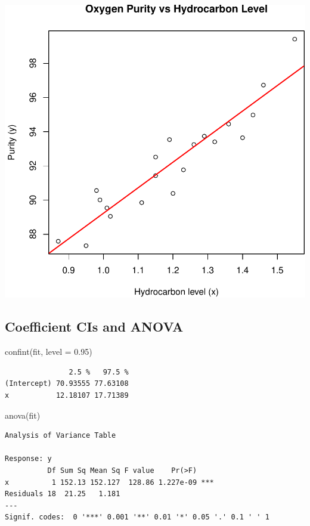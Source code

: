 \documentclass[
  letterpaper,
]{scrbook}
\newenvironment{Shaded}{\begin{snugshade}}{\end{snugshade}}
\newcommand{\AttributeTok}[1]{\textcolor[rgb]{0.40,0.45,0.13}{#1}}
\newcommand{\FloatTok}[1]{\textcolor[rgb]{0.68,0.00,0.00}{#1}}
\newcommand{\FunctionTok}[1]{\textcolor[rgb]{0.28,0.35,0.67}{#1}}
\newcommand{\NormalTok}[1]{\textcolor[rgb]{0.00,0.23,0.31}{#1}}
\begin{document}
\includegraphics{unit2-slr/slr_files/figure-pdf/plot-fit-1.pdf}

\subsection{Coefficient CIs and ANOVA}\label{coefficient-cis-and-anova}

\begin{Shaded}
\begin{Highlighting}[]
\FunctionTok{confint}\NormalTok{(fit, }\AttributeTok{level =} \FloatTok{0.95}\NormalTok{)}
\end{Highlighting}
\end{Shaded}

\begin{verbatim}
               2.5 %   97.5 %
(Intercept) 70.93555 77.63108
x           12.18107 17.71389
\end{verbatim}

\begin{Shaded}
\begin{Highlighting}[]
\FunctionTok{anova}\NormalTok{(fit)}
\end{Highlighting}
\end{Shaded}

\begin{verbatim}
Analysis of Variance Table

Response: y
          Df Sum Sq Mean Sq F value    Pr(>F)    
x          1 152.13 152.127  128.86 1.227e-09 ***
Residuals 18  21.25   1.181                      
---
Signif. codes:  0 '***' 0.001 '**' 0.01 '*' 0.05 '.' 0.1 ' ' 1
\end{verbatim}
\end{document}
